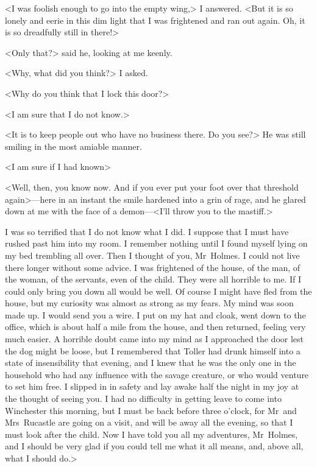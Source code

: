 <I was foolish enough to go into the empty wing,> I answered. <But it is so lonely and eerie in this dim light that I was frightened and ran out again. Oh, it is so dreadfully still in there!>

<Only that?> said he, looking at me keenly.

<Why, what did you think?> I asked.

<Why do you think that I lock this door?>

<I am sure that I do not know.>

<It is to keep people out who have no business there. Do you see?> He was still smiling in the most amiable manner.

<I am sure if I had known\longdash>

<Well, then, you know now. And if you ever put your foot over that threshold again>—here in an instant the smile hardened into a grin of rage, and he glared down at me with the face of a demon—<I'll throw you to the mastiff.>

I was so terrified that I do not know what I did. I suppose that I must have rushed past him into my room. I remember nothing until I found myself lying on my bed trembling all over. Then I thought of you, Mr~Holmes. I could not live there longer without some advice. I was frightened of the house, of the man, of the woman, of the servants, even of the child. They were all horrible to me. If I could only bring you down all would be well. Of course I might have fled from the house, but my curiosity was almost as strong as my fears. My mind was soon made up. I would send you a wire. I put on my hat and cloak, went down to the office, which is about half a mile from the house, and then returned, feeling very much easier. A horrible doubt came into my mind as I approached the door lest the dog might be loose, but I remembered that Toller had drunk himself into a state of insensibility that evening, and I knew that he was the only one in the household who had any influence with the savage creature, or who would venture to set him free. I slipped in in safety and lay awake half the night in my joy at the thought of seeing you. I had no difficulty in getting leave to come into Winchester this morning, but I must be back before three o'clock, for Mr~and Mrs~Rucastle are going on a visit, and will be away all the evening, so that I must look after the child. Now I have told you all my adventures, Mr~Holmes, and I should be very glad if you could tell me what it all means, and, above all, what I should do.>

